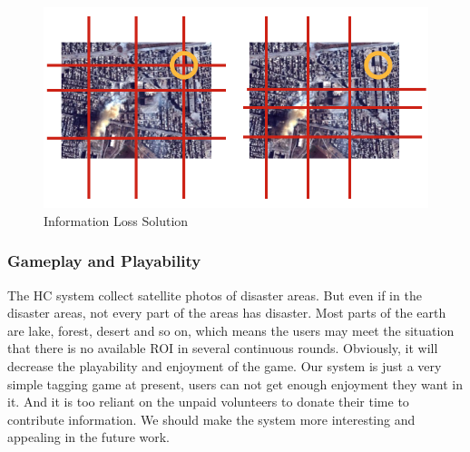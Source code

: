   \begin{figure}[htp]
  \centering
  \includegraphics[width=0.5\columnwidth]{figures/information_loss}
  \caption{Information Loss Solution}
  \label{fig:information_loss}
  \end{figure}

  \subsubsection{Gameplay and Playability}
  The HC system collect satellite photos of disaster areas. But even if in the disaster areas, 
  not every part of the areas has disaster. Most parts of the earth are lake, forest, 
  desert and so on, which means the users may meet the situation that there is no available 
  ROI in several continuous rounds. Obviously, it will decrease the playability and enjoyment of the game.
  Our system is just a very simple tagging game at present, users can not get enough enjoyment they want in it. 
  And it is too reliant on the unpaid volunteers to donate their time to contribute information. 
  We should make the system more interesting and appealing in the future work.
